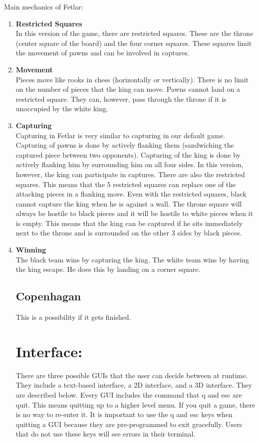 \documentclass[11pt, oneside]{article}
\begin{document}
Main mechanics of Fetlar:
\begin{enumerate}
\item \textbf{Restricted Squares}\\
  In this version of the game, there are restricted squares.  These are the throne (center square of the board) and the four corner squares.  These squares limit the movement of pawns and can be involved in captures.
\item \textbf{Movement}\\
  Pieces move like rooks in chess (horizontally or vertically).
  There is no limit on the number of pieces that the king can move.
  Pawns cannot land on a restricted square.  They can, however, pass through the throne if it is unoccupied by the white king.
\item \textbf{Capturing}\\
  Capturing in Fetlar is very similar to capturing in our default game.  Capturing of pawns is done by actively flanking them (sandwiching the captured piece between two opponents).  Capturing of the king is done by actively flanking him by surrounding him on all four sides.  In this version, however, the king can participate in captures.  There are also the restricted squares.  This means that the 5 restricted squares can replace one of the attacking pieces in a flanking move.  Even with the restricted squares, black cannot capture the king when he is against a wall.  The throne square will always be hostile to black pieces and it will be hostile to white pieces when it is empty. This means that the king can be captured if he sits immediately next to the throne and is surrounded on the other 3 sides by black pieces.
\item \textbf{Winning}\\
  The black team wins by capturing the king.  The white team wins by having the king escape.  He does this by landing on a corner square.

\subsection{Copenhagan}
This is a possibility if it gets finished.

\section{Interface:}
There are three possible GUIs that the user can decide between at runtime.  They include a text-based interface, a 2D interface, and a 3D interface.  They are described below.  Every GUI includes the command that q and esc are quit.  This means quitting up to a higher level menu. If you quit a game, there is no way to re-enter it.  It is important to use the q and esc keys when quitting a GUI because they are pre-programmed to exit gracefully.  Users that do not use these keys will see errors in their terminal.


\end{enumerate}
\end{document}
